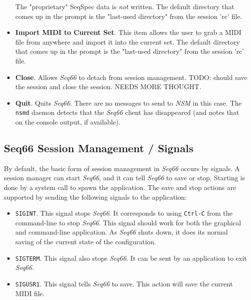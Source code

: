 \begin{itemize}
         The "proprietary" SeqSpec data is \textsl{not} written.
         The default directory that comes up in the
         prompt is the "last-used directory" from the session 'rc' file.
      \item \textbf{Import MIDI to Current Set}.
         This item allows the user to grab a MIDI file from anywhere and import
         it into the current set.
         The default directory that comes up in the
         prompt is the "last-used directory" from the session 'rc' file.
      \item \textbf{Close}.
         Allows \textsl{Seq66} to detach from session management.
         TODO:  should save the session and close the session.
         NEEDS MORE THOUGHT.
      \item \textbf{Quit}.
         Quits \textsl{Seq66}.
         There are no messages to send to \textsl{NSM} in this case.
         The \texttt{nsmd} daemon detects that the \textsl{Seq66} client has
         disappeared (and notes that on the console output, if available).
   \end{itemize}

\subsection{Seq66 Session Management / Signals}
\label{subsec:sessions_signals}

   By default, the basic form of session management in
   \textsl{Seq66} occurs by signals.  A
   session manager can start \textsl{Seq66}, and it can tell \textsl{Seq66} to
   save or stop.  Starting is done by a system call to spawn the application.
   The save and stop actions are supported by sending the following signals to
   the application:

   \begin{itemize}
      \item \texttt{SIGINT}.
         This signal stops \textsl{Seq66}. It corresponds
         to using \texttt{Ctrl-C} from the command-line to stop \textsl{Seq66}.
         This signal should work for both the graphical and command-line
         application.  As \textsl{Seq66} shuts down, it does its normal saving
         of the current state of the configuration.
      \item \texttt{SIGTERM}.
         This signal also stops \textsl{Seq66}.  It can
         be sent by an application to exit \textsl{Seq66}.
      \item \texttt{SIGUSR1}.
         This signal tells \textsl{Seq66} to save.  This
         action will save the current MIDI file.
   \end{itemize}

